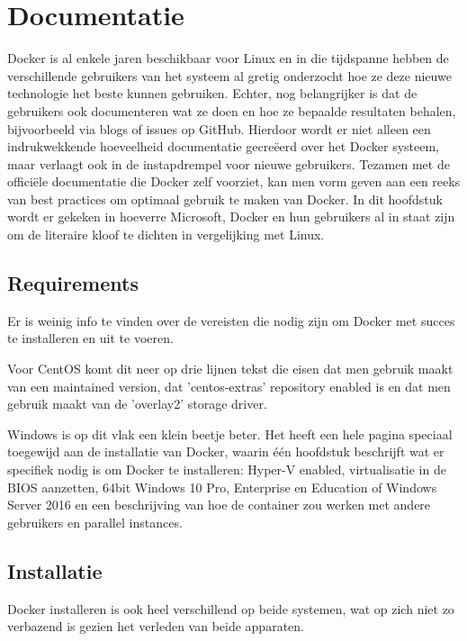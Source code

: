 
\chapter{Documentatie}
\label{ch:documentatie}

Docker is al enkele jaren beschikbaar voor Linux en in die tijdspanne hebben de verschillende gebruikers van het systeem al gretig onderzocht hoe ze deze nieuwe technologie het beste kunnen gebruiken. Echter, nog belangrijker is dat de gebruikers ook documenteren wat ze doen en hoe ze bepaalde resultaten behalen, bijvoorbeeld via blogs of issues op GitHub. Hierdoor wordt er niet alleen een indrukwekkende hoeveelheid documentatie gecreëerd over het Docker systeem, maar verlaagt ook in de instapdrempel voor nieuwe gebruikers. Tezamen met de officiële documentatie die Docker zelf voorziet, kan men vorm geven aan een reeks van best practices om optimaal gebruik te maken van Docker. In dit hoofdstuk wordt er gekeken in hoeverre Microsoft, Docker en hun gebruikers al in staat zijn om de literaire kloof te dichten in vergelijking met Linux.

\section{Requirements}
Er is weinig info te vinden over de vereisten die nodig zijn om Docker met succes te installeren en uit te voeren.

Voor CentOS komt dit neer op drie lijnen tekst die eisen dat men gebruik maakt van een maintained version, dat 'centos-extras' repository enabled is en dat men gebruik maakt van de 'overlay2' storage driver.

Windows is op dit vlak een klein beetje beter. Het heeft een hele pagina speciaal toegewijd aan de installatie van Docker, waarin één hoofdstuk beschrijft wat er specifiek nodig is om Docker te installeren: Hyper-V enabled, virtualisatie in de BIOS aanzetten, 64bit Windows 10 Pro, Enterprise en Education of Windows Server 2016 en een beschrijving van hoe de container zou werken met andere gebruikers en parallel instances.

\section{Installatie}
Docker installeren is ook heel verschillend op beide systemen, wat op zich niet zo verbazend is gezien het verleden van beide apparaten.

